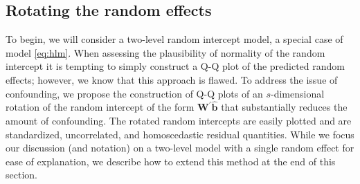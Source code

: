 \documentclass[12pt]{article} %
\newcommand{\al}[1]{{\color{red} #1}}
\begin{document}
\subsection{Rotating the random effects}\label{sec:rotate}
\al{


To begin, we will consider a two-level random intercept model, a special case of model \eqref{eq:hlm}. When assessing the plausibility of normality of the random intercept it is tempting to simply construct a Q-Q plot of the predicted random effects; however, we know that this approach is flawed. To address the issue of confounding, we propose the construction of Q-Q plots of an $s$-dimensional rotation of the random intercept of the form $\bm{W}^{\prime} \widehat{\bm{b}}$ that  substantially reduces the amount of confounding. The rotated random intercepts are easily plotted and are standardized, uncorrelated, and homoscedastic residual quantities. While we focus our discussion (and notation) on a two-level model with a single random effect for ease of explanation, we describe how to extend this method at the end of this section.

}
\end{document}
